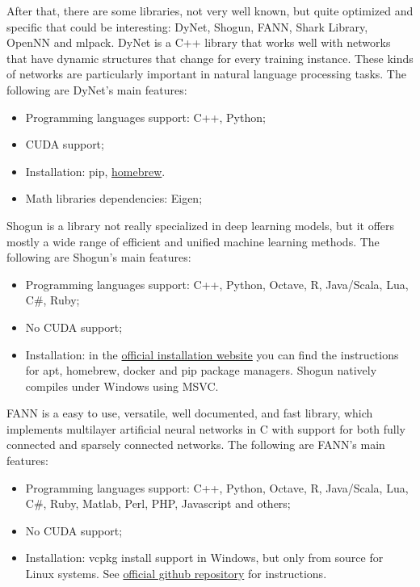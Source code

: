 After that, there are some libraries, not very well known, but quite optimized and specific that could be interesting: DyNet, Shogun, FANN, Shark Library, OpenNN and mlpack. DyNet is a C++ library that works well with networks that have dynamic structures that change for every training instance. These kinds of networks are particularly important in natural language processing tasks. The following are DyNet's main features:
\begin{itemize}
	\item Programming languages support: C++, Python; 
	\item CUDA support;
	\item Installation: pip, \href{https://formulae.brew.sh/formula/dynet}{homebrew}.
	\item Math libraries dependencies: Eigen;
\end{itemize}

Shogun is a library not really specialized in deep learning models, but it offers mostly a wide range of efficient and unified machine learning methods. The following are Shogun's main features: 
\begin{itemize}
	\item Programming languages support: C++, Python, Octave, R, Java/Scala, Lua, C\#, Ruby; 
	\item No CUDA support;
	\item Installation: in the \href{https://www.shogun.ml/install}{official installation website} you can find the instructions for apt, homebrew, docker and pip package managers. Shogun natively compiles under Windows using MSVC.
\end{itemize}

FANN is a easy to use, versatile, well documented, and fast library, which implements multilayer artificial neural networks in C with support for both fully connected and sparsely connected networks. The following are FANN's main features: 
\begin{itemize}
	\item Programming languages support: C++, Python, Octave, R, Java/Scala, Lua, C\#, Ruby, Matlab, Perl, PHP, Javascript and others; 
	\item No CUDA support;
	\item Installation: vcpkg install support in Windows, but only from source for Linux systems. See \href{https://github.com/libfann/fann}{official github repository} for instructions.
\end{itemize}

